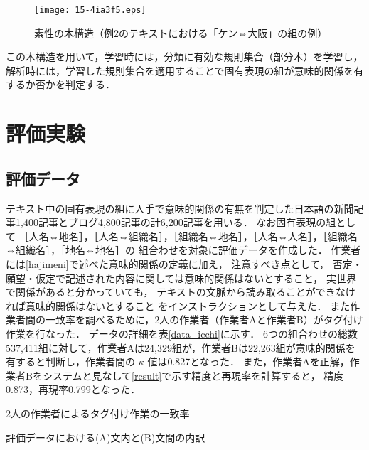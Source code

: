 \documentclass[japanese]{jnlp_1.4}
\begin{document}
\begin{figure}[t]
  \begin{center}
  \texttt{[image: 15-4ia3f5.eps]}
  \end{center}
  \caption{素性の木構造（例2のテキストにおける「ケン⇔大阪」の組の例）}
  \label{tree}
\end{figure}

この木構造を用いて，学習時には，分類に有効な規則集合（部分木）を学習し，
解析時には，学習した規則集合を適用することで固有表現の組が意味的関係を有するか否かを判定する．



\section{評価実験}
\label{eva}



\subsection{評価データ}
\label{evadata}

テキスト中の固有表現の組に人手で意味的関係の有無を判定した日本語の新聞記事1,400記事とブログ4,800記事の計6,200記事を用いる．
なお固有表現の組として
［人名⇔地名］，［人名⇔組織名］，［組織名⇔地名］，［人名⇔人名］，［組織名⇔組織名］，［地名⇔地名］の
組合わせを対象に評価データを作成した．
作業者には{\ref{hajimeni}}で述べた意味的関係の定義に加え，
注意すべき点として，
否定・願望・仮定で記述された内容に関しては意味的関係はないとすること，
実世界で関係があると分かっていても，
テキストの文脈から読み取ることができなければ意味的関係はないとすること
をインストラクションとして与えた．
また作業者間の一致率を調べるために，2人の作業者（作業者Aと作業者B）がタグ付け作業を行なった．
データの詳細を表\ref{data_icchi}に示す．
6つの組合わせの総数537,411組に対して，作業者Aは24,329組が，作業者Bは22,263組が意味的関係を有すると判断し，作業者間の $\kappa$ 値は0.827となった．
また，作業者Aを正解，作業者Bをシステムと見なして\ref{result}で示す精度と再現率を計算すると，
精度0.873，再現率0.799となった．

\begin{table}[t]
\caption{2人の作業者によるタグ付け作業の一致率}
\label{data_icchi}

\end{table}
\begin{table}[t]
\caption{評価データにおける(A)文内と(B)文間の内訳}
\label{uchiwake}

\end{table}
\end{document}
